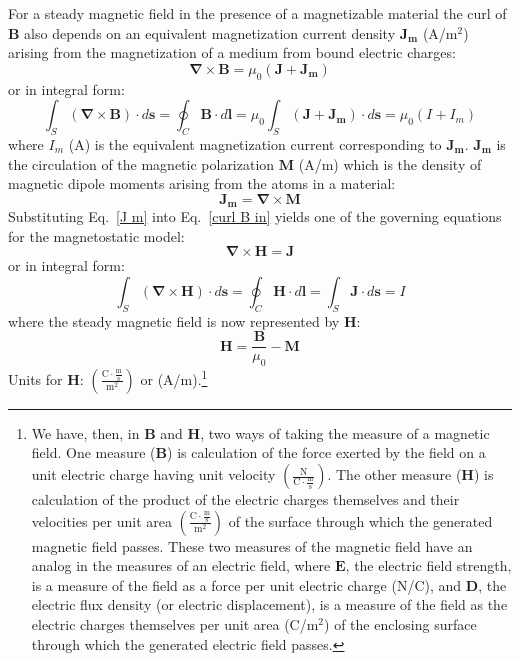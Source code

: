 For a steady magnetic field in the presence of a magnetizable material the curl of $\mathbf{B}$ also depends on an equivalent magnetization current density $\mathbf{J_m}$ (A/m$^2$) arising from the magnetization of a medium from bound electric charges:
\begin{equation}\label{curl B in}
\mathbf{\nabla} \times \mathbf{B} = \mu_0 (\mathbf{J} + \mathbf{J_m})
\end{equation}
or in integral form:
\begin{equation}\label{int B.dl in}
\int_S (\mathbf{\nabla} \times \mathbf{B}) \cdot d\mathbf{s} = \oint_C \mathbf{B} \cdot d\mathbf{l} =  \mu_0 \int_S (\mathbf{J} + \mathbf{J_m}) \cdot d\mathbf{s} = \mu_0 (I + I_m)
\end{equation}
{\noindent}where $I_m$ (A) is the equivalent magnetization current corresponding to $\mathbf{J_m}$. $\mathbf{J_m}$ is the circulation of the magnetic polarization $\mathbf{M}$ (A/m) which is the density of magnetic dipole moments arising from the atoms in a material:
\begin{equation}\label{J m}
\mathbf{J_m} = \mathbf{\nabla} \times \mathbf{M}
\end{equation}
Substituting Eq.~\ref{J m} into Eq.~\ref{curl B in} yields one of the governing equations for the magnetostatic model:
\begin{equation}\label{curl H}
\mathbf{\nabla} \times \mathbf{H} = \mathbf{J}
\end{equation}
or in integral form:
\begin{equation}\label{int H.dl}
\int_S (\mathbf{\nabla} \times \mathbf{H}) \cdot d\mathbf{s} = \oint_C \mathbf{H} \cdot d\mathbf{l} =  \int_S \mathbf{J} \cdot d\mathbf{s} = I
\end{equation}
where the steady magnetic field is now represented by $\mathbf{H}$:
\begin{equation}\label{H}
\mathbf{H} = \frac{\mathbf{B}}{\mu_0} - \mathbf{M}
\end{equation}
Units for $\mathbf{H}$: $\left( \frac{\mathrm{C} \cdot \frac{\mathrm{m}}{\mathrm{s}}}{\mathrm{m^2}} \right)$ or (A/m).\footnote{We have, then, in $\mathbf{B}$ and $\mathbf{H}$, two ways of taking the measure of a magnetic field.  One measure ($\mathbf{B}$) is calculation of the force exerted by the field on a unit electric charge having unit velocity $\left( \frac{\mathrm{N}}{\mathrm{C} \cdot \frac{\mathrm{m}}{\mathrm{s}}} \right)$.  The other measure ($\mathbf{H}$) is calculation of the product of  the electric charges themselves and their velocities per unit area $\left( \frac{\mathrm{C} \cdot \frac{\mathrm{m}}{\mathrm{s}}}{\mathrm{m^2}} \right)$ of the surface through which the generated magnetic field passes.  These two measures of the magnetic field have an analog in the measures of an electric field, where $\mathbf{E}$, the electric field strength, is a measure of the field as a force per unit electric charge (N/C), and $\mathbf{D}$, the electric flux density (or electric displacement), is a measure of 
the field as the electric charges themselves per unit area (C/m$^2$) of the enclosing surface through which the generated electric field passes.}\\

